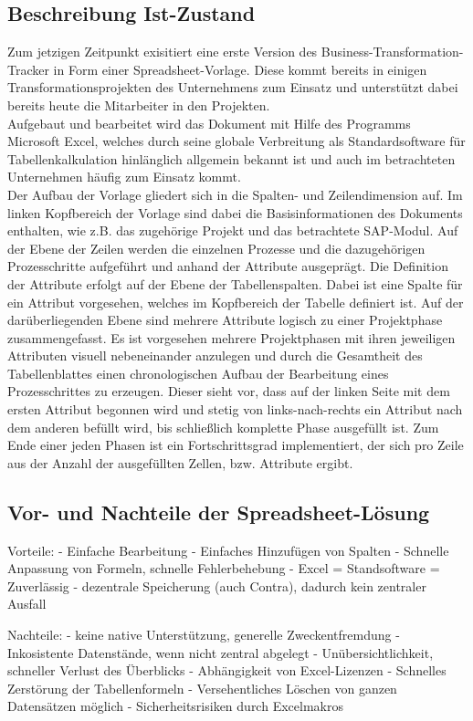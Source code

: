\subsection{Beschreibung Ist-Zustand}
Zum jetzigen Zeitpunkt exisitiert eine erste Version des Business-Transformation-Tracker in Form einer Spreadsheet-Vorlage. Diese kommt bereits in einigen Transformationsprojekten des Unternehmens zum Einsatz und unterstützt dabei bereits heute die Mitarbeiter in den Projekten.\\ Aufgebaut und bearbeitet wird das Dokument mit Hilfe des Programms Microsoft Excel, welches durch seine globale Verbreitung als Standardsoftware für Tabellenkalkulation hinlänglich allgemein bekannt ist und auch im betrachteten Unternehmen häufig zum Einsatz kommt.\\
Der Aufbau der Vorlage gliedert sich in die Spalten- und Zeilendimension auf. Im linken Kopfbereich der Vorlage sind dabei die Basisinformationen des Dokuments enthalten, wie z.B. das zugehörige Projekt und das betrachtete SAP-Modul. Auf der Ebene der Zeilen werden die einzelnen Prozesse und die dazugehörigen Prozesschritte aufgeführt und anhand der Attribute ausgeprägt. Die Definition der Attribute erfolgt auf der Ebene der Tabellenspalten. Dabei ist eine Spalte für ein Attribut vorgesehen, welches im Kopfbereich der Tabelle definiert ist. Auf der darüberliegenden Ebene sind mehrere Attribute logisch zu einer Projektphase zusammengefasst. Es ist vorgesehen mehrere Projektphasen mit ihren jeweiligen Attributen visuell nebeneinander anzulegen und durch die Gesamtheit des Tabellenblattes einen chronologischen Aufbau der Bearbeitung eines Prozesschrittes zu erzeugen. Dieser sieht vor, dass auf der linken Seite mit dem ersten Attribut begonnen wird und stetig von links-nach-rechts ein Attribut nach dem anderen befüllt wird, bis schließlich komplette Phase ausgefüllt ist. Zum Ende einer jeden Phasen ist ein Fortschrittsgrad implementiert, der sich pro Zeile aus der Anzahl der ausgefüllten Zellen, bzw. Attribute ergibt.


\subsection{Vor- und Nachteile der Spreadsheet-Lösung}
Vorteile:
- Einfache Bearbeitung
- Einfaches Hinzufügen von Spalten
- Schnelle Anpassung von Formeln, schnelle Fehlerbehebung
- Excel = Standsoftware = Zuverlässig
- dezentrale Speicherung (auch Contra), dadurch kein zentraler Ausfall

Nachteile:
- keine native Unterstützung, generelle Zweckentfremdung
- Inkosistente Datenstände, wenn nicht zentral abgelegt
- Unübersichtlichkeit, schneller Verlust des Überblicks 
- Abhängigkeit von Excel-Lizenzen
- Schnelles Zerstörung der Tabellenformeln
- Versehentliches Löschen von ganzen Datensätzen möglich
- Sicherheitsrisiken durch Excelmakros

